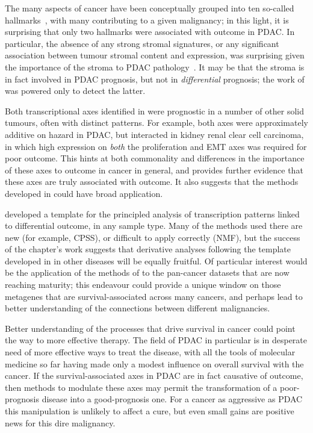 \documentclass[thesis.tex]{subfiles}
\begin{document}
The many aspects of cancer have been conceptually grouped into ten so-called hallmarks~\cite{Hanahan2011}, with many contributing to a given malignancy; in this light, it is surprising that only two hallmarks were associated with outcome in \gls{PDAC}.  In particular, the absence of any strong stromal signatures, or any significant association between tumour stromal content and expression, was surprising given the importance of the stroma to \gls{PDAC} pathology~\cite{Luo2012}.  It may be that the stroma is in fact involved in \gls{PDAC} prognosis, but not in \emph{differential} prognosis; the work of  was powered only to detect the latter.

Both transcriptional axes identified in  were prognostic in a number of other solid tumours, often with distinct patterns.  For example, both axes were approximately additive on hazard in \gls{PDAC}, but interacted in kidney renal clear cell carcinoma, in which high expression on \emph{both} the proliferation and \gls{EMT} axes was required for poor outcome.  This hints at both commonality and differences in the importance of these axes to outcome in cancer in general, and provides further evidence that these axes are truly associated with outcome.  It also suggests that the methods developed in  could have broad application.

 developed a template for the principled analysis of transcription patterns linked to differential outcome, in any sample type.  Many of the methods used there are new (for example, \gls{CPSS}), or difficult to apply correctly (\gls{NMF}), but the success of the chapter's work suggests that derivative analyses following the template developed in  in other diseases will be equally fruitful.  Of particular interest would be the application of the methods of  to the pan-cancer datasets that are now reaching maturity; this endeavour could provide a unique window on those metagenes that are survival-associated across many cancers, and perhaps lead to better understanding of the connections between different malignancies.

Better understanding of the processes that drive survival in cancer could point the way to more effective therapy.  The field of \gls{PDAC} in particular is in desperate need of more effective ways to treat the disease, with all the tools of molecular medicine so far having made only a modest influence on overall survival with the cancer.  If the survival-associated axes in \gls{PDAC} are in fact causative of outcome, then methods to modulate these axes may permit the transformation of a poor-prognosis disease into a good-prognosis one.  For a cancer as aggressive as \gls{PDAC} this manipulation is unlikely to affect a cure, but even small gains are positive news for this dire malignancy.
\end{document}
